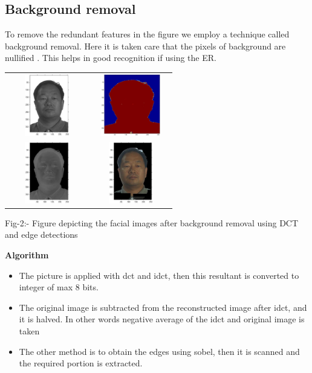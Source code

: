 \documentclass[final,3p,times,twocolumn,sort&compress]{elsarticle}
\begin{document}
\subsection{Background removal}
\hspace{1cm} To remove the redundant features in the figure we employ a technique called background removal. Here it is taken care that the pixels of background are nullified\cite{three} . This helps in good recognition if using the ER.\\
\begin{table}[htbp]
  \begin{center}
  \begin{tabular}{cc}
  \includegraphics[width=3.3cm,height=2.7cm]{back5} &  \includegraphics[width=3.3cm,height=2.7cm]{back2} \\
    \includegraphics[width=3.3cm,height=2.7cm]{back4} &  \includegraphics[width=3.3cm,height=2.7cm]{back6} \\
     \end{tabular}
Fig-2:- Figure depicting the facial images after background removal using DCT and edge detections
 \end{center}
 \end{table}

 \textbf{Algorithm}

\begin{itemize}
  \item The picture is applied with dct and idct, then this resultant is converted to integer of max 8 bits.
  \item The original image is subtracted from the reconstructed image after idct, and it is halved. In other words negative average of the idct and original image is taken
  \item The other method is to obtain the edges using sobel, then it is scanned and the required portion is extracted.
\end{itemize}
\end{document}
